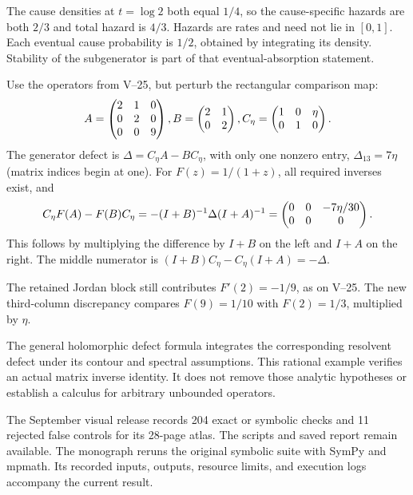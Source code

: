 The cause densities at $t=\log2$ both equal $1/4$, so the cause-specific hazards are both $2/3$ and total hazard is $4/3$. Hazards are rates and need not lie in $[0,1]$. Each eventual cause probability is $1/2$, obtained by integrating its density. Stability of the subgenerator is part of that eventual-absorption statement.

Use the operators from V--25, but perturb the rectangular comparison map:
\[
A=\begin{pmatrix}2&1&0\\0&2&0\\0&0&9\end{pmatrix},
B=\begin{pmatrix}2&1\\0&2\end{pmatrix},
C_\eta=\begin{pmatrix}1&0&\eta\\0&1&0\end{pmatrix}.
\]
The generator defect is $\Delta=C_\eta A-BC_\eta$, with only one nonzero entry, $\Delta_{13}=7\eta$ (matrix indices begin at one).
For $F(z)=1/(1+z)$, all required inverses exist, and
\[
C_\eta F(A)-F(B)C_\eta
=-(I+B)^{-1}\Delta(I+A)^{-1}
=\begin{pmatrix}0&0&-7\eta/30\\0&0&0\end{pmatrix}.
\]
This follows by multiplying the difference by $I+B$ on the left and $I+A$ on the right. The middle numerator is $(I+B)C_\eta-C_\eta(I+A)=-\Delta$.

The retained Jordan block still contributes $F'(2)=-1/9$, as on V--25. The new third-column discrepancy compares $F(9)=1/10$ with $F(2)=1/3$, multiplied by $\eta$.

The general holomorphic defect formula integrates the corresponding resolvent defect under its contour and spectral assumptions. This rational example verifies an actual matrix inverse identity. It does not remove those analytic hypotheses or establish a calculus for arbitrary unbounded operators.

The September visual release records 204 exact or symbolic checks and 11 rejected false controls for its 28-page atlas. The scripts and saved report remain available. The monograph reruns the original symbolic suite with SymPy and mpmath. Its recorded inputs, outputs, resource limits, and execution logs accompany the current result.

